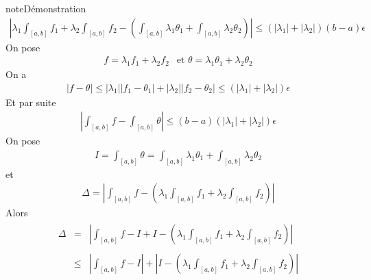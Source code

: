 \documentclass[letterpaper,10pt,french]{jupyterBook}
\begin{document}
\begin{sphinxadmonition}{note}{Démonstration}
\begin{equation*}
\begin{split}
\left|\lambda_1\int_{[a, b]} f_1 +\lambda_2\int_{[a, b]} f_2 - \left(\int_{[a, b]} \lambda_1\theta_1 + \int_{[a, b]} \lambda_2\theta_2\right)\right| \leq (|\lambda_1|+|\lambda_2|)(b-a)\epsilon
\end{split}
\end{equation*}
\sphinxAtStartPar
On pose
\begin{equation*}
\begin{split}
f= \lambda_1 f_1 + \lambda_2 f_2 ~~ \mbox{ et } \theta = \lambda_1 \theta_1 + \lambda_2 \theta_2
\end{split}
\end{equation*}
\sphinxAtStartPar
On a
\begin{equation*}
\begin{split}
|f-\theta| \leq |\lambda_1||f_1-\theta_1| + |\lambda_2||f_2 - \theta_2| \leq (|\lambda_1|+|\lambda_2|)\epsilon
\end{split}
\end{equation*}
\sphinxAtStartPar
Et par suite
\begin{equation*}
\begin{split}
\left|\int_{[a, b]} f- \int_{[a, b]} \theta \right| \leq (b-a)(|\lambda_1|+|\lambda_2|)\epsilon
\end{split}
\end{equation*}
\sphinxAtStartPar
On pose
\begin{equation*}
\begin{split}
I = \int_{[a, b]} \theta = \int_{[a, b]} \lambda_1\theta_1 + \int_{[a, b]} \lambda_2\theta_2
\end{split}
\end{equation*}
\sphinxAtStartPar
et
\begin{equation*}
\begin{split}
\Delta = \left|\int_{[a, b]} f- \left(\lambda_1\int_{[a, b]} f_1 +\lambda_2\int_{[a, b]} f_2\right)\right|
\end{split}
\end{equation*}
\sphinxAtStartPar
Alors
\begin{equation*}
\begin{split}
\begin{aligned}
\Delta &=& \left|\int_{[a, b]} f- I + I - \left(\lambda_1\int_{[a, b]} f_1 +\lambda_2\int_{[a, b]} f_2\right)\right| \\ \\
& \leq & \left|\int_{[a, b]} f- I\right| + \left| I - \left(\lambda_1\int_{[a, b]} f_1 +\lambda_2\int_{[a, b]} f_2\right)\right| \\ \\

\end{aligned}
\end{split}
\end{equation*}
\end{sphinxadmonition}
\end{document}
